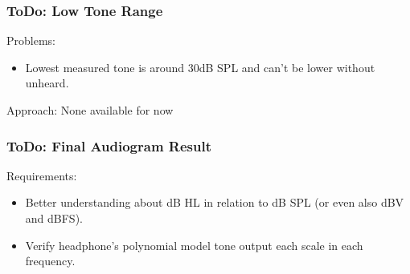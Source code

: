 \documentclass[table,dvipsnames]{beamer}
\begin{document}
	\begin{frame}[fragile]
		\frametitle{ToDo: Low Tone Range}
		
		\begin{exampleblock}{}
			Problems: 
			\begin{itemize}
				\item Lowest measured tone is around 30dB SPL and can't be lower without unheard.
			\end{itemize}
		\end{exampleblock}
	
		\begin{exampleblock}{}
			Approach: None available for now
		\end{exampleblock}
	\end{frame}

	\begin{frame}[fragile]
		\frametitle{ToDo: Final Audiogram Result}
		
		\begin{exampleblock}{}
			Requirements: 
			\begin{itemize}
				\item Better understanding about dB HL in relation to dB SPL (or even also dBV and dBFS).
				\item Verify headphone's polynomial model tone output each scale in each frequency.
			\end{itemize}
		\end{exampleblock}
	\end{frame}
\end{document}
